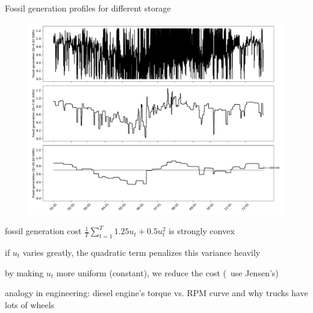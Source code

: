 \documentclass[aspectratio=169,11pt]{beamer}
\begin{document}
\begin{frame}{Fossil generation profiles for different storage}
	
\begin{figure}
\centering
\includegraphics[width=0.5\columnwidth]{./figures/fossil_profiles.pdf}
\end{figure}

\BIT
\item fossil generation cost $\frac{1}{T}\sum_{t=1}^{T} 1.25 u_t + 0.5 u_t^2$ is strongly convex
\item if $u_t$ varies greatly, the quadratic term penalizes this variance heavily
\item by making $u_t$ more uniform (constant), we reduce the cost (\ie \ use Jensen's)
\item analogy in engineering: diesel engine's torque vs. RPM curve and why trucks have lots of wheels
\EIT
\end{frame}
\end{document}
